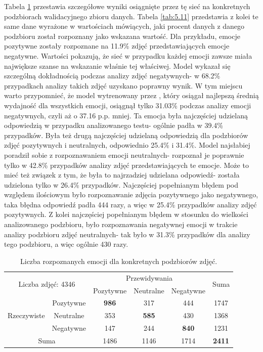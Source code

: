 Tabela \ref{tab:5.10} przestawia szczegółowe wyniki osiągnięte przez tę sieć na konkretnych podzbiorach walidacyjnego zbioru danych. Tabela \ref{tab:5.11} przedstawia z kolei te same dane wyrażone w wartościach mówiących, jaki procent danych z danego podzbioru został rozpoznany jako wskazana wartość. Dla przykładu, emocje pozytywne zostały rozpoznane na 11.9\% zdjęć przedstawiających emocje negatywne. Wartości pokazują, że sieć w przypadku każdej emocji zawsze miała największe szanse na wskazanie właśnie tej właściwej. Model wykazał się szczególną dokładnością podczas analizy zdjęć negatywnych- w 68.2\% przypadkach analizy takich zdjęć uzyskano poprawny wynik. W tym miejscu warto przypomnieć, że model wytrenowany przez \cite{GAD}, który osiągał najlepszą średnią wydajność dla wszystkich emocji, osiągnął tylko 31.03\% podczas analizy emocji negatywnych, czyli aż o 37.16 p.p. mniej. Ta emocja była najczęściej udzielaną odpowiedzią w przypadku analizowanego testu- ogólnie padła w 39.4\% przypadków. Była też drugą najczęściej udzielaną odpowiedzią dla podzbiorów zdjęć pozytywnych i neutralnych, odpowiednio 25.4\% i 31.4\%. Model najsłabiej poradził sobie z rozpoznawaniem emocji neutralnych- rozpoznał je poprawnie tylko w 42.8\% przypadków analizy zdjęć przedstawiających te emocje. Może to mieć też związek z tym, że była to najrzadziej udzielana odpowiedź- została udzielona tylko w 26.4\% przypadków. Najczęściej popełnianym błędem pod względem ilościowym było rozpoznawanie zdjęcia pozytywnego jako negatywnego, taka błędna odpowiedź padła 444 razy, a więc w 25.4\% przypadków analizy zdjęć pozytywnych. Z kolei najczęściej popełnianym błędem w stosunku do wielkości analizowanego podzbioru, było rozpoznawania negatywnej emocji w trakcie analizy podzbioru zdjęć neutralnych- tak było w 31.3\% przypadków dla analizy tego podzbioru, a więc ogólnie 430 razy.

\begin{table}[H]
  \centering
  \caption{Liczba rozpoznanych emocji dla konkretnych podzbiorów zdjęć.}
    \begin{tabular}{ |cc|ccc|c| }
    \hline
    \multicolumn{2}{|c|}{\multirow{2}{*}{Liczba zdjęć: 4346}} & \multicolumn{3}{c|}{Przewidywania} & \multirow{2}{*}{Suma} \\
    && Pozytywne & Neutralne & \multicolumn{1}{c|}{Negatywne} & \\
    \hline
    \multirow{3}{*}{Rzeczywiste} & Pozytywne & \textbf{986} & 317 & 444 & 1747 \\
    & Neutralne & 353 & \textbf{585} & 430 & 1368 \\
    & Negatywne & 147 & 244 & \textbf{840} & 1231 \\
    \hline
    \multicolumn{2}{|c|}{Suma} & 1486 & 1146 & 1714 & \textbf{2411} \\
    \hline
    \end{tabular}
  \label{tab:5.10}
\end{table}

